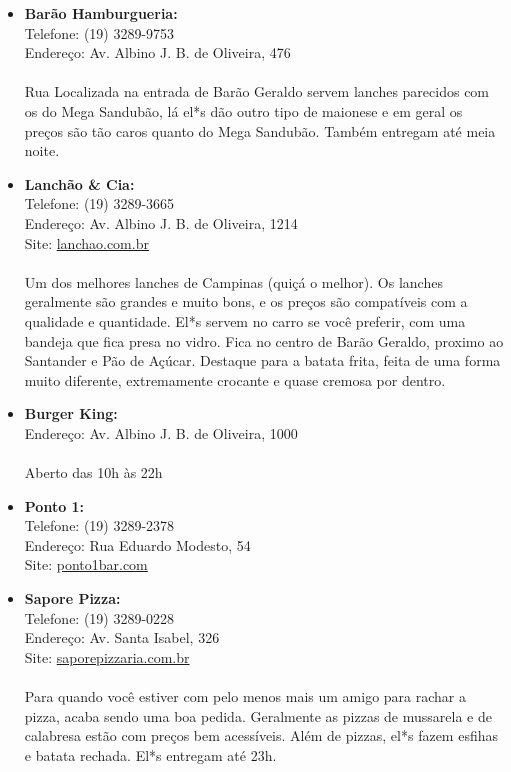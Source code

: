 \begin{itemize}
    \item   \textbf{Barão Hamburgueria:}
        \\Telefone: (19) 3289-9753
        \\Endereço: Av. Albino J. B. de Oliveira, 476
        \\\\
        Rua Localizada na entrada de Barão Geraldo servem lanches parecidos com
        os do Mega Sandubão, lá el*s dão outro tipo de maionese e em geral os
        preços são tão caros quanto do Mega Sandubão. Também entregam até meia
        noite.

    \item   \textbf{Lanchão \& Cia:}
        \\Telefone: (19) 3289-3665
        \\Endereço: Av. Albino J. B. de Oliveira, 1214
        \\Site: \url{lanchao.com.br}
        \\\\
        Um dos melhores lanches de Campinas (quiçá o melhor). Os lanches
        geralmente são grandes e muito bons, e os preços são compatíveis com a
        qualidade e quantidade. El*s servem no carro se você preferir, com uma
        bandeja que fica presa no vidro. Fica no centro de Barão Geraldo,
        proximo ao Santander e Pão de Açúcar. Destaque para a batata frita,
        feita de uma forma muito diferente, extremamente crocante e quase
        cremosa por dentro.

    \item   \textbf{Burger King:}
        \\Endereço: Av. Albino J. B. de Oliveira, 1000
        \\\\
        Aberto das 10h às 22h

    \item   \textbf{Ponto 1:}
        \\Telefone: (19) 3289-2378
        \\Endereço: Rua Eduardo Modesto, 54
        \\Site: \url{ponto1bar.com}

      \item   \textbf{Sapore Pizza:}
        \\Telefone: (19) 3289-0228
        \\Endereço: Av. Santa Isabel, 326
        \\Site: \url{saporepizzaria.com.br}
        \\\\
        Para quando você estiver com pelo menos mais um amigo para rachar a
        pizza, acaba sendo uma boa pedida. Geralmente as pizzas de mussarela e
        de calabresa estão com preços bem acessíveis. Além de pizzas, el*s fazem
        esfihas e batata rechada. El*s entregam até 23h.


\end{itemize}
